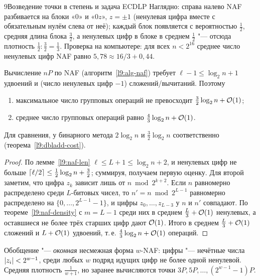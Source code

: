 \begin{lecture}{9}{Возведение точки в степень и задача ECDLP}
Наглядно: справа налево NAF разбивается на блоки «$0$» и «$0 z$», $z = \pm 1$ (ненулевая
цифра вместе с обязательным нулём слева от неё); каждый блок появляется с вероятностью
$\frac12$, средняя длина блока $\frac32$, а ненулевых цифр в блоке в среднем $\frac12$ "---
отсюда плотность $\frac12 : \frac32 = \frac13$. Проверка на компьютере: для всех
$n < 2^{16}$ среднее число ненулевых цифр NAF равно $5{,}78 \approx 16/3 + 0{,}44$.

\begin{corollary}\label{l9:naf-cost}
Вычисление $nP$ по NAF (алгоритм~\ref{l9:alg-naf}) требует $\ell - 1 \le \log_2 n + 1$ удвоений
и (число ненулевых цифр $- 1$) сложений/вычитаний. Поэтому
\begin{enumerate}
  \item максимальное число групповых операций не превосходит $\frac32 \log_2 n + \mathcal{O}(1)$;
  \item среднее число групповых операций равно $\frac43 \log_2 n + \mathcal{O}(1)$.
\end{enumerate}
Для сравнения, у бинарного метода $2\log_2 n$ и $\frac32 \log_2 n$ соответственно
(теорема~\ref{l9:dbladd-cost}).
\end{corollary}

\begin{proof}
По лемме~\ref{l9:naf-len} $\ell \le L + 1 \le \log_2 n + 2$, и ненулевых цифр не больше
$\lceil\ell/2\rceil \le \frac12 \log_2 n + \frac32$; суммируя, получаем первую оценку. Для второй
заметим, что цифра $z_k$ зависит лишь от $n \bmod 2^{k+2}$. Если $n$ равномерно распределено
среди $L$-битовых чисел, то $n' = n \bmod 2^{L-1}$ равномерно распределено на
$\{0, \dots, 2^{L-1} - 1\}$, и цифры $z_0, \dots, z_{L-3}$ у $n$ и $n'$ совпадают. По
теореме~\ref{l9:naf-density} с $m = L - 1$ среди них в среднем $\frac L3 + \mathcal{O}(1)$ ненулевых,
а оставшиеся не более трёх старших цифр дают $\mathcal{O}(1)$. Итого в среднем
$\frac L3 + \mathcal{O}(1)$ сложений и $L + \mathcal{O}(1)$ удвоений, т.\,е. $\frac43 \log_2 n + \mathcal{O}(1)$
операций.
\end{proof}

\begin{remark}[окна]
Обобщение "--- \emph{оконная} несмежная форма $w$-NAF: цифры "--- нечётные числа
$\lvert z_i\rvert < 2^{w-1}$, среди любых $w$ подряд идущих цифр не более одной ненулевой. Средняя
плотность $\frac1{w+1}$, но заранее вычисляются точки $3P, 5P, \dots, (2^{w-1} - 1)P$.
\end{remark}


\end{lecture}
